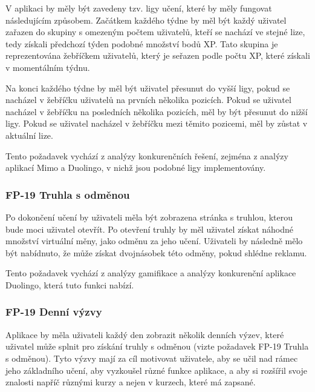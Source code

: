 V aplikaci by měly být zavedeny tzv. ligy učení, které by měly fungovat následujícím způsobem. Začátkem každého týdne by měl být každý uživatel zařazen do skupiny s omezeným počtem uživatelů, kteří se nachází ve stejné lize, tedy získali předchozí týden podobné množství bodů XP. Tato skupina je reprezentována žebříčkem uživatelů, který je seřazen podle počtu XP, které získali v momentálním týdnu.

Na konci každého týdne by měl být uživatel přesunut do vyšší ligy, pokud se nacházel v žebříčku uživatelů na prvních několika pozicích. Pokud se uživatel nacházel v žebříčku na posledních několika pozicích, měl by být přesunut do nižší ligy. Pokud se uživatel nacházel v žebříčku mezi těmito pozicemi, měl by zůstat v aktuální lize.

Tento požadavek vychází z analýzy konkurenčních řešení, zejména z analýzy aplikací Mimo a Duolingo, v nichž jsou podobné ligy implementovány.

\subsubsection{FP-19 Truhla s odměnou}

Po dokončení učení by uživateli měla být zobrazena stránka s truhlou, kterou bude moci uživatel otevřít. Po otevření truhly by měl uživatel získat náhodné množství virtuální měny, jako odměnu za jeho učení. Uživateli by následně mělo být nabídnuto, že může získat dvojnásobek této odměny, pokud shlédne reklamu.

Tento požadavek vychází z analýzy gamifikace a analýzy konkurenční aplikace Duolingo, která tuto funkci nabízí.

\subsubsection{FP-19 Denní výzvy}

Aplikace by měla uživateli každý den zobrazit několik denních výzev, které uživatel může splnit pro získání truhly s odměnou (vizte požadavek FP-19 Truhla s odměnou). %
Tyto výzvy mají za cíl motivovat uživatele, aby se učil nad rámec jeho základního učení, aby vyzkoušel různé funkce aplikace, a aby si rozšířil svoje znalosti napříč různými kurzy a nejen v kurzech, které má zapsané.

